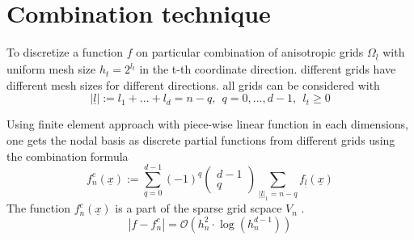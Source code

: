\section{Combination technique}
To discretize a function $f$ on particular combination of anisotropic grids $\Omega_{\underline{l}}$ with uniform mesh size $h_{t} = 2^{l_{t}}$ in the t-th coordinate direction.  different grids have different mesh sizes for different directions. 
all grids can be considered with
\begin{equation}
	|\underline{l}| := l_1 + ... + l_d = n-q, \ \ q = 0,...,d - 1, \ \ l_t \ge 0
\end{equation}

Using finite element approach with piece-wise linear function in each dimensions, one gets the nodal basis as discrete partial functions from different grids using the combination formula
\begin{equation}
	f_n^c(\underline{x}) := \sum_{q=0}^{d-1}(-1)^q \left( \begin{array}{c}
	d-1 \\
	q  \end{array} \right) \sum_{|\underline{l}|_1=n-q} f_{\underline{l}}(\underline{x})
\end{equation}
The function $f_n^c(\underline{x})$ is a part of the sparse grid scpace $V_{n}$ .
\begin{equation}
	|f-f_n^c| = \mathcal{O}\left(h_n^2 \cdot \log(h_{n}^{d-1}) \right)
\end{equation}

